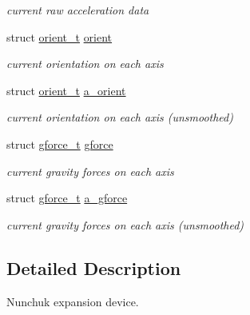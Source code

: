 \begin{DoxyCompactItemize}
\begin{DoxyCompactList}\small\item\em current raw acceleration data \end{DoxyCompactList}\item 
\hypertarget{structnunchuk__t_a24ca076b817418f2e2c1507965256b45}{struct \hyperlink{structorient__t}{orient\-\_\-t} \hyperlink{structnunchuk__t_a24ca076b817418f2e2c1507965256b45}{orient}}\label{structnunchuk__t_a24ca076b817418f2e2c1507965256b45}

\begin{DoxyCompactList}\small\item\em current orientation on each axis \end{DoxyCompactList}\item 
\hypertarget{structnunchuk__t_a6efb9dfa3391cb3815d6a1741cb4525b}{struct \hyperlink{structorient__t}{orient\-\_\-t} \hyperlink{structnunchuk__t_a6efb9dfa3391cb3815d6a1741cb4525b}{a\-\_\-orient}}\label{structnunchuk__t_a6efb9dfa3391cb3815d6a1741cb4525b}

\begin{DoxyCompactList}\small\item\em current orientation on each axis (unsmoothed) \end{DoxyCompactList}\item 
\hypertarget{structnunchuk__t_a79d598a365f147ca23c67e592776fde0}{struct \hyperlink{structgforce__t}{gforce\-\_\-t} \hyperlink{structnunchuk__t_a79d598a365f147ca23c67e592776fde0}{gforce}}\label{structnunchuk__t_a79d598a365f147ca23c67e592776fde0}

\begin{DoxyCompactList}\small\item\em current gravity forces on each axis \end{DoxyCompactList}\item 
\hypertarget{structnunchuk__t_a50d07c79c66f167b7fdb7ee56f173516}{struct \hyperlink{structgforce__t}{gforce\-\_\-t} \hyperlink{structnunchuk__t_a50d07c79c66f167b7fdb7ee56f173516}{a\-\_\-gforce}}\label{structnunchuk__t_a50d07c79c66f167b7fdb7ee56f173516}

\begin{DoxyCompactList}\small\item\em current gravity forces on each axis (unsmoothed) \end{DoxyCompactList}\end{DoxyCompactItemize}


\subsection{Detailed Description}
Nunchuk expansion device. 

